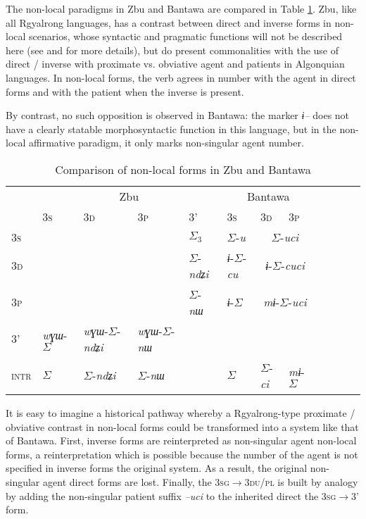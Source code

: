 \documentclass[twoside,a4paper,11pt]{article}
\newcommand{\ipa}[1]{{\phon\textit{#1}}}
\newcommand{\grise}[1]{\cellcolor{lightgray}\textbf{#1}}
\newcommand{\Σ}{\greek{Σ}}
\newcommand{\ro}{$\Sigma$}
\newcommand{\rc}{$\Sigma_3$}
\begin{document}
The non-local paradigms in Zbu and Bantawa are compared in Table \ref{tab:non.loc}. Zbu, like all Rgyalrong languages, has a contrast between direct and inverse forms in non-local scenarios, whose syntactic and pragmatic functions will not be described here (see \citealt{jacques10inverse} and \citealt{gongxun14agreement} for more details), but do present commonalities with the use of direct / inverse with proximate vs. obviative agent and patients in Algonquian languages. In non-local forms, the verb agrees in number with the agent in direct forms and with the patient when the inverse is present.

By contrast, no such opposition is observed in Bantawa: the marker  \ipa{ɨ--} does not have a clearly statable  morphosyntactic function in this language, but in the non-local affirmative paradigm, it only marks non-singular agent number.

\begin{table}
\caption{Comparison of non-local forms in Zbu and Bantawa}\label{tab:non.loc} \centering
\begin{tabular}{l|llll|lllllll}
\toprule
&\multicolumn{4}{c}{Zbu} & \multicolumn{3}{c}{Bantawa} \\
&\textsc{3s} & \textsc{3d} & \textsc{3p} &3' &\textsc{3s} & \textsc{3d} & \textsc{3p} \\
\hline
\textsc{3s} &\grise{} &\grise{} &\grise{} &\rc{}& \ro{}-\ipa{u} & \multicolumn{2}{c}{\ro{}-\ipa{uci}} \\ 
\textsc{3d} &\grise{} &\grise{} &\grise{} &\ro{}-\ipa{ndʑi} & \ipa{ɨ}-\ro{}-\ipa{cu}\cellcolor{green} & \multicolumn{2}{c}{\ipa{ɨ}-\ro{}-\ipa{cuci}\cellcolor{green}} \\ 
\textsc{3p} &\grise{} &\grise{} &\grise{} &\ro{}-\ipa{nɯ} & \ipa{ɨ}-\ro{}\cellcolor{green} & \multicolumn{2}{c}{\ipa{mɨ}-\ro{}-\ipa{uci}} \\ 
3' & \ipa{wɣɯ}-\ro{} \cellcolor{green}& \ipa{wɣɯ}-\ro{}-\ipa{ndʑi}  \cellcolor{green}& \ipa{wɣɯ}-\ro{}-\ipa{nɯ} \cellcolor{green}&\grise{} &\grise{} &\grise{} &\grise{} \\
\hline
\textsc{intr} & \ro{} & \ro{}-\ipa{ndʑi}  & \ro{}-\ipa{nɯ}  &\grise{}& \ro{} & \ro{}-\ipa{ci}  &\ipa{mɨ}-\ro{} \\
\bottomrule
\end{tabular}
\end{table}

It is easy to imagine a historical pathway whereby a Rgyalrong-type proximate / obviative contrast in non-local forms could be transformed into  a system like that of Bantawa. First, inverse forms are reinterpreted as non-singular agent non-local forms, a reinterpretation which is possible because the number of the agent is not specified in inverse forms the original system. As a result, the original non-singular agent direct forms are lost. Finally, the \textsc{3sg$\rightarrow$3du/pl} is built by analogy by adding the non-singular patient suffix \ipa{--uci} to the inherited direct the \textsc{3sg$\rightarrow$3'} form. 
\end{document}
